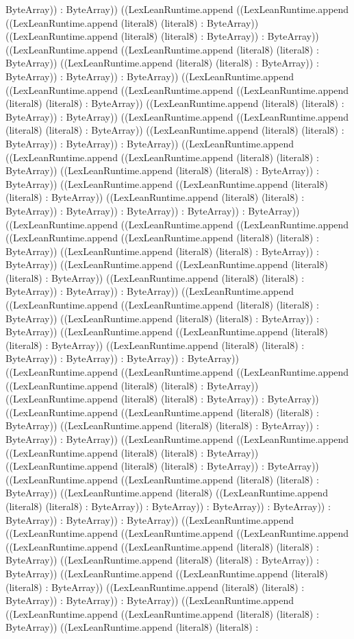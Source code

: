 \documentclass[11pt]{article}
\begin{document}
ByteArray)) : ByteArray)) ((LexLeanRuntime.append ((LexLeanRuntime.append ((LexLeanRuntime.append (literal8) (literal8) : ByteArray)) ((LexLeanRuntime.append (literal8) (literal8) : ByteArray)) : ByteArray)) ((LexLeanRuntime.append ((LexLeanRuntime.append (literal8) (literal8) : ByteArray)) ((LexLeanRuntime.append (literal8) (literal8) : ByteArray)) : ByteArray)) : ByteArray)) : ByteArray)) ((LexLeanRuntime.append ((LexLeanRuntime.append ((LexLeanRuntime.append ((LexLeanRuntime.append (literal8) (literal8) : ByteArray)) ((LexLeanRuntime.append (literal8) (literal8) : ByteArray)) : ByteArray)) ((LexLeanRuntime.append ((LexLeanRuntime.append (literal8) (literal8) : ByteArray)) ((LexLeanRuntime.append (literal8) (literal8) : ByteArray)) : ByteArray)) : ByteArray)) ((LexLeanRuntime.append ((LexLeanRuntime.append ((LexLeanRuntime.append (literal8) (literal8) : ByteArray)) ((LexLeanRuntime.append (literal8) (literal8) : ByteArray)) : ByteArray)) ((LexLeanRuntime.append ((LexLeanRuntime.append (literal8) (literal8) : ByteArray)) ((LexLeanRuntime.append (literal8) (literal8) : ByteArray)) : ByteArray)) : ByteArray)) : ByteArray)) : ByteArray)) ((LexLeanRuntime.append ((LexLeanRuntime.append ((LexLeanRuntime.append ((LexLeanRuntime.append ((LexLeanRuntime.append (literal8) (literal8) : ByteArray)) ((LexLeanRuntime.append (literal8) (literal8) : ByteArray)) : ByteArray)) ((LexLeanRuntime.append ((LexLeanRuntime.append (literal8) (literal8) : ByteArray)) ((LexLeanRuntime.append (literal8) (literal8) : ByteArray)) : ByteArray)) : ByteArray)) ((LexLeanRuntime.append ((LexLeanRuntime.append ((LexLeanRuntime.append (literal8) (literal8) : ByteArray)) ((LexLeanRuntime.append (literal8) (literal8) : ByteArray)) : ByteArray)) ((LexLeanRuntime.append ((LexLeanRuntime.append (literal8) (literal8) : ByteArray)) ((LexLeanRuntime.append (literal8) (literal8) : ByteArray)) : ByteArray)) : ByteArray)) : ByteArray)) ((LexLeanRuntime.append ((LexLeanRuntime.append ((LexLeanRuntime.append ((LexLeanRuntime.append (literal8) (literal8) : ByteArray)) ((LexLeanRuntime.append (literal8) (literal8) : ByteArray)) : ByteArray)) ((LexLeanRuntime.append ((LexLeanRuntime.append (literal8) (literal8) : ByteArray)) ((LexLeanRuntime.append (literal8) (literal8) : ByteArray)) : ByteArray)) : ByteArray)) ((LexLeanRuntime.append ((LexLeanRuntime.append ((LexLeanRuntime.append (literal8) (literal8) : ByteArray)) ((LexLeanRuntime.append (literal8) (literal8) : ByteArray)) : ByteArray)) ((LexLeanRuntime.append ((LexLeanRuntime.append (literal8) (literal8) : ByteArray)) ((LexLeanRuntime.append (literal8) ((LexLeanRuntime.append (literal8) (literal8) : ByteArray)) : ByteArray)) : ByteArray)) : ByteArray)) : ByteArray)) : ByteArray)) : ByteArray)) ((LexLeanRuntime.append ((LexLeanRuntime.append ((LexLeanRuntime.append ((LexLeanRuntime.append ((LexLeanRuntime.append ((LexLeanRuntime.append (literal8) (literal8) : ByteArray)) ((LexLeanRuntime.append (literal8) (literal8) : ByteArray)) : ByteArray)) ((LexLeanRuntime.append ((LexLeanRuntime.append (literal8) (literal8) : ByteArray)) ((LexLeanRuntime.append (literal8) (literal8) : ByteArray)) : ByteArray)) : ByteArray)) ((LexLeanRuntime.append ((LexLeanRuntime.append ((LexLeanRuntime.append (literal8) (literal8) : ByteArray)) ((LexLeanRuntime.append (literal8) (literal8) : 
\end{document}
